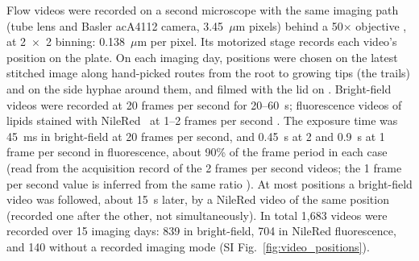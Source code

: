 Flow videos were recorded on a second microscope with the same imaging path (tube lens and Basler acA4112 camera, 3.45~$\mu$m pixels) behind a 50$\times$ objective , at 2~$\times$~2 binning: 0.138~$\mu$m per pixel.
Its motorized stage records each video's position on the plate.
On each imaging day, positions were chosen on the latest stitched image along hand-picked routes from the root to growing tips (the trails) and on the side hyphae around them, and filmed with the lid on .
Bright-field videos were recorded at 20 frames per second for 20--60~s; fluorescence videos of lipids stained with NileRed~\cite{kleinCytoplasmicFlowDynamics2026} at 1--2 frames per second .
The exposure time was 45~ms in bright-field at 20 frames per second, and 0.45~s at 2 and 0.9~s at 1 frame per second in fluorescence, about 90\% of the frame period in each case (read from the acquisition record of the 2 frames per second videos; the 1 frame per second value is inferred from the same ratio ).
At most positions a bright-field video was followed, about 15~s later, by a NileRed video of the same position (recorded one after the other, not simultaneously).
In total 1,683 videos were recorded over 15 imaging days: 839 in bright-field, 704 in NileRed fluorescence, and 140 without a recorded imaging mode (SI Fig.~\ref{fig:video_positions}).


